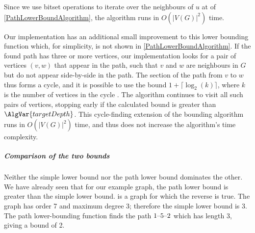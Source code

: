 {    Since we use bitset operations to iterate over the neighbours of $u$ at 
    of \cref{PathLowerBoundAlgorithm}, the algorithm runs in $O(|V(G)|^2)$ time.

    Our implementation has an additional small improvement to this lower bounding function which,
    for simplicity, is not shown in \cref{PathLowerBoundAlgorithm}.  If the found path
    has three or more vertices, our implementation looks for a pair of vertices $(v,w)$ that
    appear in the path, such that $v$ and $w$ are neighbours in $G$ but do not appear
    side-by-side in the path.
    The section of the path from $v$ to $w$ thus forms a cycle, and it is possible to use the
    bound $1 + \lceil \log_2(k)\rceil$, where $k$ is the number of vertices in the cycle \cite{DBLP:books/daglib/0030491}.
    The algorithm continues to visit all such pairs of vertices, stopping early if the
    calculated bound is greater than $\AlgVar{targetDepth}$.  This cycle-finding extension
    of the bounding algorithm runs in $O(|V(G)|^2)$ time, and thus does not increase the algorithm's
    time complexity.

    \subparagraph*{Comparison of the two bounds}

    Neither the simple lower bound nor the path lower bound dominates the other.  We have already
    seen that for our example graph, the path lower bound is greater than the simple lower bound.
     is a graph for which the reverse is true.  The graph has order 7 and
    maximum degree 3; therefore the simple lower bound is 3.  The path lower-bounding function
    finds the path $1\text{--} 5\text{--} 2$ which has length 3, giving a bound of 2.

    \begin{figure}[htb]
      \centering


\end{figure}}
